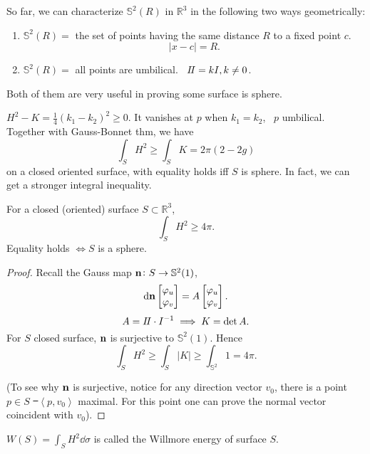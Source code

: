 \begin{remark}
    So far, we can characterize \(\mathbb{S}^2(R)\) in \(\mathbb{R}^3\) in the
    following two ways geometrically:
    \begin{enumerate}[(1)]
        \item \(\mathbb{S}^2(R)=\) the set of points having the same distance
            \(R\) to a fixed point \(c\). \ie\ \[
                |x-c|=R
            .\] 
        \item \(\mathbb{S}^2(R)=\) all points are umbilical. \ie\ \(I\!I=kI,k\neq 0\).
    \end{enumerate}
    Both of them are very useful in proving some surface is sphere.
\end{remark}
\begin{remark}
    \(H^2-K=\frac{1}{4}(k_1-k_2)^2\ge 0\). It vanishes at \(p\) when \(k_1=k_2\),
    \ie\ \(p\) umbilical. Together with Gauss-Bonnet thm, we have \[
        \int_{S}H^2\ge \int_{S}K=2\pi(2-2g)
    \] on a closed oriented surface, with equality holds iff \(S\) is sphere.
    In fact, we can get a stronger integral inequality.
\end{remark}
\begin{theorem}
    For a closed (oriented) surface \(S\subset \mathbb{R}^3\), \[
        \int_{S}H^2\ge 4\pi
    .\] Equality holds \(\iff S\) is a sphere.
\end{theorem}
\begin{proof}
    Recall the Gauss map \(\vb{n}\colon S\to \mathbb{S}^2(1)\), \[
        \dd{\vb{n}}\begin{bmatrix}
            \varphi_u \\ \varphi_v
        \end{bmatrix}=A\begin{bmatrix}
            \varphi_u \\ \varphi_v
        \end{bmatrix}
    .\] \[
        A=I\!I\cdot I^{-1}\implies K=\det A
    .\] For \(S\) closed surface, \(\vb{n}\) is surjective to \(\mathbb{S}^2(1)\).
    Hence \[
        \int_{S}H^2\ge \int_{S}|K|\ge \int_{\mathbb{S}^2}1=4\pi
    .\]

    (To see why \(\vb{n}\) is surjective, notice for any direction vector \(v_0\),
    there is a point \(p\in S\) \st\ \(\left<p,v_0\right> \) maximal. For this point
    one can prove the normal vector coincident with \(v_0\)).
\end{proof}

\begin{definition}
    \(W(S)=\int_{S}H^2\dd{\sigma}\) is called the Willmore energy of surface \(S\).
\end{definition}

